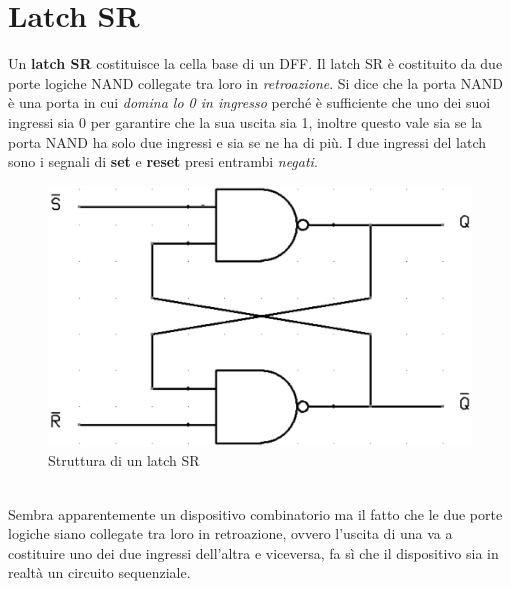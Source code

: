 \documentclass[12pt, a4paper]{report}
\begin{document}
\section{Latch SR}
Un \textbf{latch SR} costituisce la cella base di un DFF. Il latch SR è costituito da due porte logiche NAND collegate tra loro in \textit{retroazione}. Si dice che la porta NAND è una porta in cui \textit{domina lo 0 in ingresso} perché è sufficiente che uno dei suoi ingressi sia 0 per garantire che la sua uscita sia 1, inoltre questo vale sia se la porta NAND ha solo due ingressi e sia se ne ha di più. I due ingressi del latch sono i segnali di \textbf{set} e \textbf{reset} presi entrambi \textit{negati}.
\begin{figure}[h]
    \centering
    \includegraphics[scale=0.39,angle=0]{latch_sr.png}
    \caption{Struttura di un latch SR}
    \label{sr}
\end{figure}
\\Sembra apparentemente un dispositivo combinatorio ma il fatto che le due porte logiche siano collegate tra loro in retroazione, ovvero l'uscita di una va a costituire uno dei due ingressi dell'altra e viceversa, fa sì che il dispositivo sia in realtà un circuito sequenziale.
\end{document}
